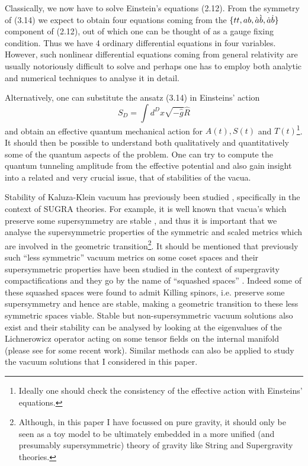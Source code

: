 \documentclass[a4paper,12pt]{article}
\begin{document}
Classically, we now have to solve Einstein's equations (2.12). From the symmetry of (3.14) we expect to obtain four equations coming from the $\{tt,ab,\grave{a}\grave{b},\dot{a}\dot{b}\}$ component of (2.12), out of which one can be thought of as a gauge fixing condition. Thus we have 4 ordinary differential equations in four variables. However, such nonlinear differential equations coming from general relativity are usually notoriously difficult to solve and perhaps one has to employ both analytic and numerical techniques to analyse it in detail.

Alternatively, one can substitute the ansatz (3.14) in Einsteins' action
\begin{equation} S_{D}=\int d^{D}x \sqrt{-\hat{g}}\hat{R} \end{equation}
and obtain an effective quantum mechanical action for $A(t),S(t)$ and $T(t)$\footnote{ Ideally one should check the consistency of the effective action with Einsteins' equations.}.  It should then be possible to understand both qualitatively and quantitatively some of the quantum aspects of the problem. One can try to  compute the  quantum tunneling amplitude from the effective potential and also gain insight into a related and very crucial issue, that of stabilities of the vacua.

Stability of Kaluza-Klein vacuum has previously been studied \cite{stability}, specifically in the context of SUGRA theories. For example, it is well known that vacua's which preserve some supersymmetry are stable \cite{stability}, and thus it is important that we analyse the supersymmetric properties of the symmetric and scaled metrics which are involved in the geometric transition\footnote{Although, in this paper I have focussed on pure gravity, it should  only be seen as a toy model to be ultimately embedded in a more unified (and presumably supersymmetric) theory of gravity like String and Supergravity theories.}. It should be mentioned that previously such ``less symmetric'' vacuum metrics on some coset spaces and their supersymmetric properties have been studied  in the context of supergravity compactifications and they go by the name of ``squashed spaces'' \cite{squashed}. Indeed some of these squashed spaces were found to admit Killing spinors, i.e. preserve some supersymmetry and hence are stable, making a geometric transition to these less symmetric spaces viable. Stable but  non-supersymmetric vacuum solutions also exist and their stability can be analysed by looking at the eigenvalues of the Lichnerowicz operator acting on some tensor fields on the internal manifold (please see \cite{horowitz} for some recent work). Similar methods can also be applied to study the vacuum solutions that I considered in this paper. 
\end{document}
